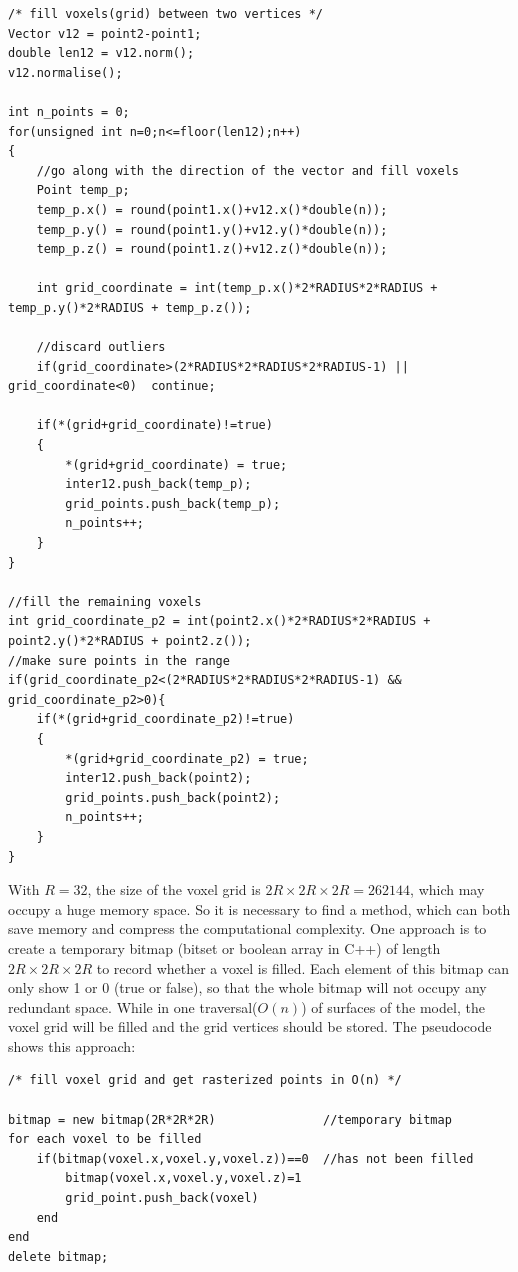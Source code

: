\begin{lstlisting}[xleftmargin=0em]
/* fill voxels(grid) between two vertices */
Vector v12 = point2-point1;
double len12 = v12.norm();
v12.normalise();

int n_points = 0;
for(unsigned int n=0;n<=floor(len12);n++)
{
    //go along with the direction of the vector and fill voxels
	Point temp_p;
	temp_p.x() = round(point1.x()+v12.x()*double(n));
	temp_p.y() = round(point1.y()+v12.y()*double(n));
	temp_p.z() = round(point1.z()+v12.z()*double(n));

	int grid_coordinate	= int(temp_p.x()*2*RADIUS*2*RADIUS + temp_p.y()*2*RADIUS + temp_p.z());

	//discard outliers
	if(grid_coordinate>(2*RADIUS*2*RADIUS*2*RADIUS-1) || grid_coordinate<0)  continue; 

	if(*(grid+grid_coordinate)!=true)
	{
		*(grid+grid_coordinate) = true;
		inter12.push_back(temp_p);
		grid_points.push_back(temp_p);
		n_points++;
	}
}

//fill the remaining voxels
int grid_coordinate_p2 = int(point2.x()*2*RADIUS*2*RADIUS + point2.y()*2*RADIUS + point2.z());
//make sure points in the range
if(grid_coordinate_p2<(2*RADIUS*2*RADIUS*2*RADIUS-1) && grid_coordinate_p2>0){
	if(*(grid+grid_coordinate_p2)!=true)
	{
		*(grid+grid_coordinate_p2) = true;
		inter12.push_back(point2);
		grid_points.push_back(point2);
		n_points++;
	} 
}
\end{lstlisting}

With $R = 32$, the size of the voxel grid is $2R\times2R\times2R = 262144$, which may occupy a huge memory space. So it is necessary to find a method, which can both save memory and compress the computational complexity. One approach is to create a temporary bitmap (bitset or boolean array in C++) of length $2R\times2R\times2R$ to record whether a voxel is filled. Each element of this bitmap can only show 1 or 0 (true or false), so that the whole bitmap will not occupy any redundant space. While in one traversal($O(n)$) of surfaces of the model, the voxel grid will be filled and the grid vertices should be stored. The pseudocode shows this approach: 

\begin{lstlisting}[xleftmargin=0em]
/* fill voxel grid and get rasterized points in O(n) */

bitmap = new bitmap(2R*2R*2R)               //temporary bitmap
for each voxel to be filled
    if(bitmap(voxel.x,voxel.y,voxel.z))==0  //has not been filled
        bitmap(voxel.x,voxel.y,voxel.z)=1
        grid_point.push_back(voxel)
    end
end
delete bitmap;
\end{lstlisting}

